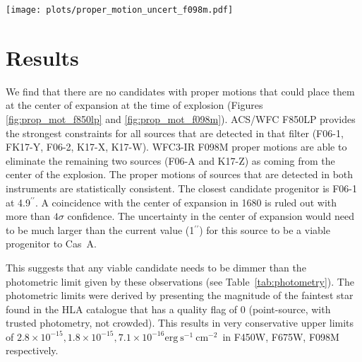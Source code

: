 \documentclass{aa}
\begin{document}
\begin{figure*}[h!]
 \centering
 \texttt{[image: plots/proper\_motion\_uncert\_f098m.pdf]}
    \caption{HST F098M image (epoch 2010-10-29) showing the probabilities for the positions of the candidates in 1680. The center of expansion (including the uncertainty of $1\arcsec$) is depicted as a black circle. The search radius of 600~\kms around the center of expansion is shown in orange. The contours show 68\%, 95\%, and 99.7\% confidence intervals (using the same colors as in Figure~\ref{fig:pure_seds}). A red arrow marks the movement since 1680 to their current position. }
       \label{fig:prop_mot_f098m}
\end{figure*}

%



\section{Results}

We find that there are no candidates with proper motions that could place them at the center of expansion at the time of explosion (Figures \ref{fig:prop_mot_f850lp} and \ref{fig:prop_mot_f098m}). ACS/WFC F850LP provides the strongest constraints for all sources that are detected in that filter (F06-1, FK17-Y, F06-2, K17-X, K17-W). WFC3-IR F098M proper motions are able to eliminate the remaining two sources (F06-A and K17-Z) as coming from the center of the explosion. The proper motions of sources that are detected in both instruments are statistically consistent. The closest candidate progenitor is F06-1 at 4.9$^{\prime\prime}$. A coincidence with the center of expansion in 1680 is ruled out with more than $4\sigma$ confidence. The uncertainty in the center of expansion would need to be much larger than the current value (1$^{\prime\prime}$) for this source to be a viable progenitor to Cas~A.

This suggests that any viable candidate needs to be dimmer than the photometric
limit given by these observations (see Table~\ref{tab:photometry}). The photometric limits were derived by presenting the magnitude of the faintest star found in the HLA catalogue that has a quality flag of 0 (point-source, with trusted photometry, not crowded). This results in very conservative upper limits of $2.8\times10^{-15}, 1.8\times10^{-15}, 7.1\times10^{-16} \textrm{erg}~\textrm{s}^{-1}~\textrm{cm}^{-2}$\ in F450W, F675W, F098M respectively.
\end{document}
